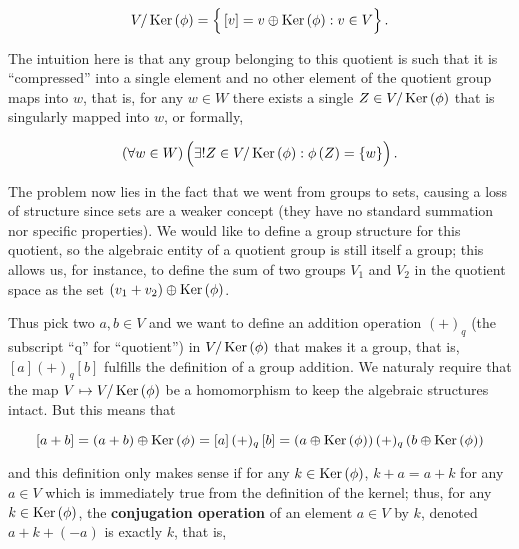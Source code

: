 \begin{equation} V/\Ker\left(\phi\right) = \left\{\raisebox{4mm}{}  \left[v\right] = v \oplus \Ker\left(\phi\right): v\in V\right\} .\end{equation}

	The intuition here is that any group belonging to this quotient is such that it is ``compressed'' into a single element and no other element of the quotient group maps into $w$, that is, for any $w\in W$ there exists a single $Z \in V/\operatorname{Ker}\left(\phi\right)$ that is singularly mapped into $w$, or formally,

\begin{equation} \left(\forall w\in W\right)\left(\raisebox{4mm}{} \exists! Z \in V/\Ker\left(\phi\right): \phi\left(Z\right) = \left\{w\right\}\right) .\end{equation}

	The problem now lies in the fact that we went from groups to sets, causing a loss of structure since sets are a weaker concept (they have no standard summation nor specific properties). We would like to define a group structure for this quotient, so the algebraic entity of a quotient group is still itself a group; this allows us, for instance, to define the sum of two groups $V_1$ and $V_2$ in the quotient space as the set $\left(v_1 + v_2\right)\oplus \operatorname{Ker}\left(\phi\right)$.

	Thus pick two $a,b\in V$ and we want to define an addition operation $(+)_q$ (the subscript ``q'' for ``quotient'') in $V/\operatorname{Ker}\left(\phi\right)$ that makes it a group, that is, $\left[a\right](+)_q\left[b\right]$ fulfills the definition of a group addition. We naturaly require that the map $V\mapsto V/\operatorname{Ker}\left(\phi\right)$ be a homomorphism to keep the algebraic structures intact. But this means that

\begin{equation} \left[a+ b\right] = \left(a + b\right) \oplus \operatorname{Ker}\left(\phi\right) = \left[a\right] (+)_q\left[b\right] = \left(a\oplus \operatorname{Ker}\left(\phi\right)\right) (+)_q \left(b \oplus\operatorname{Ker}\left(\phi\right)\right) \end{equation}

	\noindent and this definition only makes sense if for any $k\in\operatorname{Ker}\left(\phi\right)$, $k + a = a + k$ for any $a\in V$ which is immediately true from the definition of the kernel; thus, for any $k\in\operatorname{Ker}\left(\phi\right)$, the \textbf{conjugation operation} of an element $a\in V$ by $k$, denoted $a + k + \left(-a\right)$ is exactly $k$, that is,

